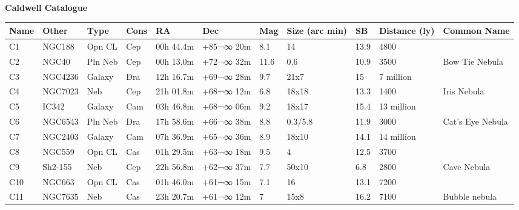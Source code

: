 \documentclass[10pt,twoside,a4paper,english]{report}
\begin{document}
{\bf Caldwell Catalogue}  
\begin{longtable}{@{}lllllllllll@{}} 
\hline 
{\bf Name} & {\bf Other} & {\bf Type} & {\bf Cons} & {\bf RA}  & {\bf Dec} & {\bf Mag} & {\bf Size (arc min)} & {\bf SB} & {\bf Distance (ly)} & {\bf Common Name}               \\ 
\hline 
C1         & NGC188      & Opn CL     & Cep       & 00h 44.4m & +85¬∞ 20m  & 8.1       & 14                   & 13.9     & 4800                &                                 \\ 
C2         & NGC40       & Pln Neb    & Cep       & 00h 13.0m & +72¬∞ 32m  & 11.6      & 0.6                  & 10.9     & 3500                & Bow Tie Nebula                  \\ 
C3         & NGC4236     & Galaxy     & Dra       & 12h 16.7m & +69¬∞ 28m  & 9.7       & 21x7                 & 15       & 7 million           &                                 \\ 
C4         & NGC7023     & Neb        & Cep       & 21h 01.8m & +68¬∞ 12m  & 6.8       & 18x18                & 13.3     & 1400                & Iris Nebula                     \\ 
C5         & IC342       & Galaxy     & Cam       & 03h 46.8m & +68¬∞ 06m  & 9.2       & 18x17                & 15.4     & 13 million          &                                 \\ 
C6         & NGC6543     & Pln Neb    & Dra       & 17h 58.6m & +66¬∞ 38m  & 8.8       & 0.3/5.8              & 11.9     & 3000                & Cat's Eye Nebula                \\ 
C7         & NGC2403     & Galaxy     & Cam       & 07h 36.9m & +65¬∞ 36m  & 8.9       & 18x10                & 14.1     & 14 million          &                                 \\ 
C8         & NGC559      & Opn CL     & Cas       & 01h 29.5m & +63¬∞ 18m  & 9.5       & 4                    & 12.5     & 3700                &                                 \\ 
C9         & Sh2-155     & Neb        & Cep       & 22h 56.8m & +62¬∞ 37m  & 7.7       & 50x10                & 6.8      & 2800                & Cave Nebula                     \\ 
C10        & NGC663      & Opn CL     & Cas       & 01h 46.0m & +61¬∞ 15m  & 7.1       & 16                   & 13.1     & 7200                &                                 \\ 
C11        & NGC7635     & Neb        & Cas       & 23h 20.7m & +61¬∞ 12m  & 7         & 15x8                 & 16.2     & 7100                & Bubble nebula                   \\ 

\end{longtable}
\end{document}
